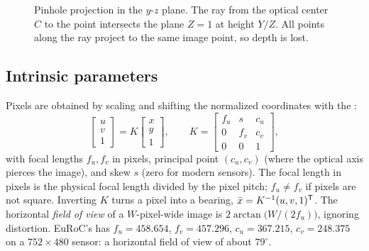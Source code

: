 \begin{figure}[t]
\centering
{}
\caption{Pinhole projection in the $y$-$z$ plane. The ray from the optical center $C$ to the point intersects the plane $Z = 1$ at height $Y/Z$. All points
along the ray project to the same image point, so depth is lost.}
\label{fig:pinhole}
\end{figure}

\subsection{Intrinsic parameters}

Pixels are obtained by scaling and shifting the normalized coordinates with the :
\begin{equation}
  \begin{bmatrix} u \\ v \\ 1 \end{bmatrix} = K\begin{bmatrix} x \\ y \\ 1 \end{bmatrix}, \qquad
  K = \begin{bmatrix} f_u & s & c_u \\ 0 & f_v & c_v \\ 0 & 0 & 1 \end{bmatrix},
\end{equation}
with focal lengths $f_u, f_v$ in pixels, principal point $(c_u, c_v)$ (where the optical axis pierces the image), and skew $s$ (zero for modern sensors). The
focal length in pixels is the physical focal length divided by the pixel pitch; $f_u \neq f_v$ if pixels are not square. Inverting $K$ turns a pixel into a bearing,
$\bar x = K^{-1}(u, v, 1)^{\mathsf{T}}$. The horizontal \emph{field of view} of a $W$-pixel-wide image is $2\arctan\big(W/(2f_u)\big)$, ignoring distortion. EuRoC's  has
$f_u = 458.654$, $f_v = 457.296$, $c_u = 367.215$, $c_v = 248.375$ on a $752\times480$ sensor: a horizontal field of view of about $79^\circ$.

